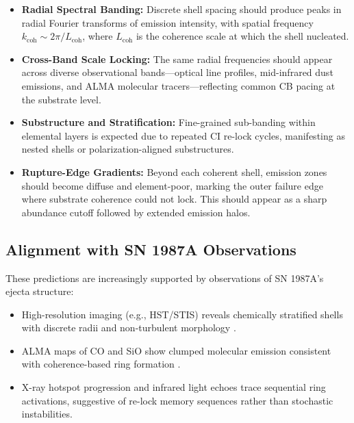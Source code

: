 \documentclass[preprints,article,submit,pdftex,moreauthors]{Definitions/mdpi}
\begin{document}
\begin{itemize}
  \item \textbf{Radial Spectral Banding:} Discrete shell spacing should produce peaks in radial Fourier transforms of emission intensity, with spatial frequency \( k_{\mathrm{coh}} \sim 2\pi / L_{\mathrm{coh}} \), where \( L_{\mathrm{coh}} \) is the coherence scale at which the shell nucleated.
  
  \item \textbf{Cross-Band Scale Locking:} The same radial frequencies should appear across diverse observational bands—optical line profiles, mid-infrared dust emissions, and ALMA molecular tracers—reflecting common CB pacing at the substrate level.

  \item \textbf{Substructure and Stratification:} Fine-grained sub-banding within elemental layers is expected due to repeated CI re-lock cycles, manifesting as nested shells or polarization-aligned substructures.

  \item \textbf{Rupture-Edge Gradients:} Beyond each coherent shell, emission zones should become diffuse and element-poor, marking the outer failure edge where substrate coherence could not lock. This should appear as a sharp abundance cutoff followed by extended emission halos.
\end{itemize}

\subsection[\appendixname~\thesubsection]{Alignment with SN 1987A Observations}

These predictions are increasingly supported by observations of SN 1987A’s ejecta structure:

\begin{itemize}
  \item High-resolution imaging (e.g., HST/STIS) reveals chemically stratified shells with discrete radii and non-turbulent morphology \cite{fransson2015,larsson2016}.
  \item ALMA maps of CO and SiO show clumped molecular emission consistent with coherence-based ring formation \cite{alma2017,abellan2020}.
  \item X-ray hotspot progression and infrared light echoes trace sequential ring activations, suggestive of re-lock memory sequences rather than stochastic instabilities.
\end{itemize}
\end{document}
